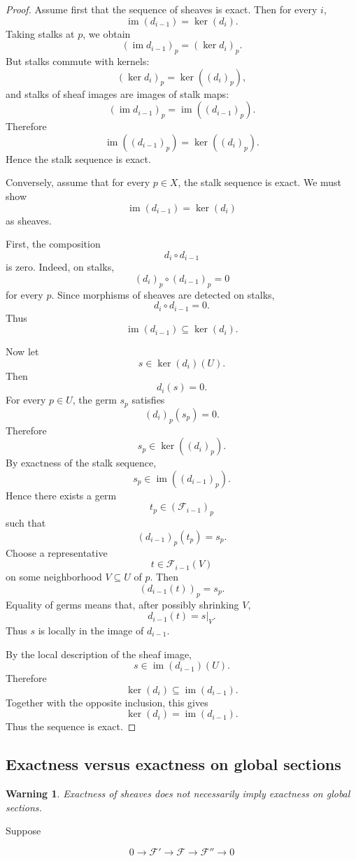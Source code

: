 \documentclass[12pt,a4paper]{article}
\newtheorem{warning}[theorem]{Warning}
\newcommand{\im}{\operatorname{im}}
\begin{document}
\begin{proof}
	Assume first that the sequence of sheaves is exact.
	Then for every $i$,
	\[
	\im(d_{i-1})=\ker(d_i).
	\]
	Taking stalks at $p$, we obtain
	\[
	(\im d_{i-1})_p=(\ker d_i)_p.
	\]
	But stalks commute with kernels:
	\[
	(\ker d_i)_p=\ker((d_i)_p),
	\]
	and stalks of sheaf images are images of stalk maps:
	\[
	(\im d_{i-1})_p=\im((d_{i-1})_p).
	\]
	Therefore
	\[
	\im((d_{i-1})_p)=\ker((d_i)_p).
	\]
	Hence the stalk sequence is exact.
	
	Conversely, assume that for every $p \in X$, the stalk sequence is exact.
	We must show
	\[
	\im(d_{i-1})=\ker(d_i)
	\]
	as sheaves.
	
	First, the composition
	\[
	d_i\circ d_{i-1}
	\]
	is zero.
	Indeed, on stalks,
	\[
	(d_i)_p\circ (d_{i-1})_p=0
	\]
	for every $p$.
	Since morphisms of sheaves are detected on stalks,
	\[
	d_i\circ d_{i-1}=0.
	\]
	Thus
	\[
	\im(d_{i-1})\subseteq \ker(d_i).
	\]
	
	Now let
	\[
	s \in \ker(d_i)(U).
	\]
	Then
	\[
	d_i(s)=0.
	\]
	For every $p \in U$, the germ $s_p$ satisfies
	\[
	(d_i)_p(s_p)=0.
	\]
	Therefore
	\[
	s_p \in \ker((d_i)_p).
	\]
	By exactness of the stalk sequence,
	\[
	s_p \in \im((d_{i-1})_p).
	\]
	Hence there exists a germ
	\[
	t_p \in (\mathcal F_{i-1})_p
	\]
	such that
	\[
	(d_{i-1})_p(t_p)=s_p.
	\]
	Choose a representative
	\[
	t \in \mathcal F_{i-1}(V)
	\]
	on some neighborhood $V \subseteq U$ of $p$.
	Then
	\[
	(d_{i-1}(t))_p=s_p.
	\]
	Equality of germs means that, after possibly shrinking $V$,
	\[
	d_{i-1}(t)=s|_V.
	\]
	Thus $s$ is locally in the image of $d_{i-1}$.
	
	By the local description of the sheaf image,
	\[
	s \in \im(d_{i-1})(U).
	\]
	Therefore
	\[
	\ker(d_i)\subseteq \im(d_{i-1}).
	\]
	Together with the opposite inclusion, this gives
	\[
	\ker(d_i)=\im(d_{i-1}).
	\]
	Thus the sequence is exact.
\end{proof}

\subsection{Exactness versus exactness on global sections}

\begin{warning}
	Exactness of sheaves does not necessarily imply exactness on global sections.
\end{warning}

Suppose

\[
0
\longrightarrow
\mathcal F'
\longrightarrow
\mathcal F
\longrightarrow
\mathcal F''
\longrightarrow
0
\]
\end{document}
